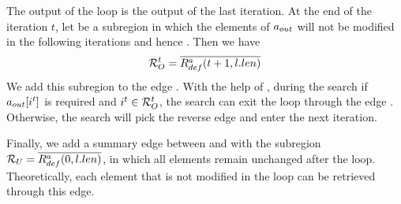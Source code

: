 \begin{comment}
%
Note that once the edge \EdgeRight{\AOutI^t}{\AInI^{t+1}} is selected during the search, we get an explicit data dependence between two iterations.
That is, in order to obtain a value in the iteration $t$, we need another value in the iteration $t+1$. 
As a result, the generated loop will have the opposite iteration order as the original one.
Similarly, the edge from \AInI to \AOutI is actually \EdgeRight{\AInI^t}{\AOutI^{t-1}}, and if this edge is selected during the search, the generated loop will have the same running order as the original one. \TODO{Show rvs and fwd edges.}
%
\end{comment}



The output of the loop \AOut is the output of the last iteration. 
At the end of the iteration $t$, let \Rb be a subregion in which the elements of $a_{out}$ will not be modified in the following iterations and hence \EquivRange{\AOutI}{\AOut}{\Rb}.
Then we have 
$$\mathcal{R}^t_{O}=\overline{R^a_{def}(t+1,l.len)}$$
We add this subregion to the edge \Edge{\AOutI}{\AOut}. 
With the help of \Rc, during the search if $a_{out}[i^t]$ is required and $i^t\in \mathcal{R}^t_{O}$, the search can exit the loop through the edge \EdgeRight{\AOutI}{\AOut}.
Otherwise, the search will pick the reverse edge \EdgeRight{\AOutI}{\AInI} and enter the next iteration.


Finally, we add a summary edge between \AIn and \AOut with the subregion $\mathcal{R}_{U}=\overline{R^a_{def}(0,l.len)}$, in which all elements remain unchanged after the loop.
Theoretically, each element that is not modified in the loop can be retrieved through this edge.

\begin{comment}
To sum up, the three special subregions we just defined are:
\begin{itemize}
\item \Ra: The subregion in which the elements of $a$ are not modified in the previous iterations at the beginning of the iteration $t$.
\item \Rb: The subregion in which the elements of $a$ will not be modified after the iteration $t$.
\item \Rd: The subregion in which the elements of $a$ are not modified in the loop.
\end{itemize}
\end{comment}

